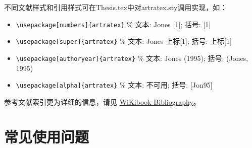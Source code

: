不同文献样式和引用样式可在Thesis.tex中对artratex.sty调用实现，如：
\begin{itemize}
    \footnotesize
    \item \verb+\usepackage[numbers]{artratex}+ $\%$ 文本: Jones [1]; 括号: [1]
    \item \verb+\usepackage[super]{artratex}+ $\%$ 文本: Jones 上标[1]; 括号: 上标[1]
    \item \verb+\usepackage[authoryear]{artratex}+ $\%$ 文本: Jones (1995); 括号: (Jones, 1995)
    \item \verb+\usepackage[alpha]{artratex}+ $\%$ 文本: 不可用; 括号: [Jon95]
\end{itemize}

%
%
%
%

参考文献索引更为详细的信息，请见 \href{https://en.wikibooks.org/wiki/LaTeX/Bibliography_Management}{WiKibook Bibliography}。

\nocite{*}

\section{常见使用问题}\label{sec:qa}

